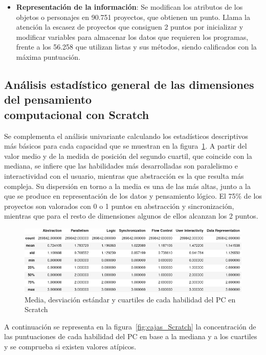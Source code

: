 \documentclass[a4paper, 12pt]{book}
\begin{document}
\begin{itemize}
    \item \textbf{Representación de la información}: Se modifican los atributos de los objetos o personajes en 90.751 proyectos, que obtienen un punto. Llama la atención la escasez de proyectos que consiguen 2 puntos por inicializar y modificar variables para almacenar los datos que requieren los programas, frente a los 56.258 que utilizan listas y sus métodos, siendo calificados con la máxima puntuación.     
\end{itemize}

\subsection{Análisis estadístico general de las dimensiones del pensamiento \\computacional con Scratch}
\label{subsec:estad_pc_Scratch}

Se complementa el análisis univariante calculando los estadísticos descriptivos más básicos para cada capacidad que se muestran en la figura~\ref{fig:describe_Scratch}. A partir del valor medio y de la medida de posición del segundo cuartil, que coincide con la mediana, se infiere que las habilidades más desarrolladas son paralelismo e interactividad con el usuario, mientras que abstracción es la que resulta más compleja. Su dispersión en torno a la media es una de las más altas, junto a la que se produce en representación de los datos y pensamiento lógico. El 75\% de los proyectos son valorados con 0 o 1 puntos en abstracción y sincronización, mientras que para el resto de dimensiones algunos de ellos alcanzan los 2 puntos. 

\begin{figure}[H]
    \centering
    \includegraphics[width=1\textwidth]{img/describe_Scratch.png}
    \caption{Media, desviación estándar y cuartiles de cada habilidad del PC en Scratch}
    \label{fig:describe_Scratch}
\end{figure}

A continuación se representa en la figura~\ref{fig:cajas_Scratch} la concentración de las puntuaciones de cada habilidad del PC en base a la mediana y a los cuartiles y se comprueba si existen valores atípicos.
\end{document}
